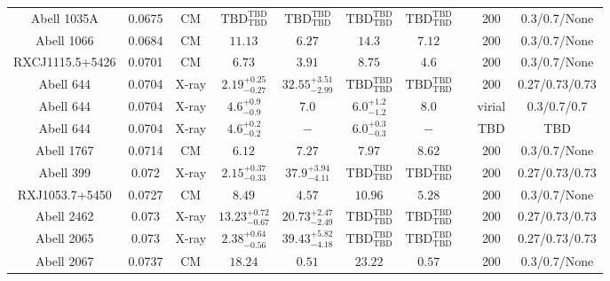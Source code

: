 \begin{table}
\begin{tabular}{cccccccccc}
Abell 1035A & 0.0675 & CM & ${\mathrm{TBD}}^{\mathrm{TBD}}_{\mathrm{TBD}}$ & ${\mathrm{TBD}}^{\mathrm{TBD}}_{\mathrm{TBD}}$ & ${\mathrm{TBD}}^{\mathrm{TBD}}_{\mathrm{TBD}}$ & ${\mathrm{TBD}}^{\mathrm{TBD}}_{\mathrm{TBD}}$ & \citet{RI06.1} & 200 & 0.3/0.7/None \\
Abell 1066 & 0.0684 & CM & ${11.13}^{}_{}$ & ${6.27}^{}_{}$ & ${14.3}^{}_{}$ & ${7.12}^{}_{}$ & \citet{RI06.1} & 200 & 0.3/0.7/None \\
RXCJ1115.5+5426 & 0.0701 & CM & ${6.73}^{}_{}$ & ${3.91}^{}_{}$ & ${8.75}^{}_{}$ & ${4.6}^{}_{}$ & \citet{RI06.1} & 200 & 0.3/0.7/None \\
Abell 644 & 0.0704 & X-ray & ${2.19}^{+0.25}_{-0.27}$ & ${32.55}^{+3.51}_{-2.99}$ & ${\mathrm{TBD}}^{\mathrm{TBD}}_{\mathrm{TBD}}$ & ${\mathrm{TBD}}^{\mathrm{TBD}}_{\mathrm{TBD}}$ & \citet{BA14.1} & 200 & 0.27/0.73/0.73 \\
Abell 644 & 0.0704 & X-ray & ${4.6}^{+0.9}_{-0.9}$ & ${7.0}^{}_{}$ & ${6.0}^{+1.2}_{-1.2}$ & ${8.0}^{}_{}$ & \citet{BU05.1} & virial & 0.3/0.7/0.7 \\
Abell 644 & 0.0704 & X-ray & ${4.6}^{+0.2}_{-0.2}$ & ${-}^{}_{}$ & ${6.0}^{+0.3}_{-0.3}$ & ${-}^{}_{}$ & \citet{XU01.1} & TBD & TBD \\
Abell 1767 & 0.0714 & CM & ${6.12}^{}_{}$ & ${7.27}^{}_{}$ & ${7.97}^{}_{}$ & ${8.62}^{}_{}$ & \citet{RI06.1} & 200 & 0.3/0.7/None \\
Abell 399 & 0.072 & X-ray & ${2.15}^{+0.37}_{-0.33}$ & ${37.9}^{+3.94}_{-4.11}$ & ${\mathrm{TBD}}^{\mathrm{TBD}}_{\mathrm{TBD}}$ & ${\mathrm{TBD}}^{\mathrm{TBD}}_{\mathrm{TBD}}$ & \citet{BA14.1} & 200 & 0.27/0.73/0.73 \\
RXJ1053.7+5450 & 0.0727 & CM & ${8.49}^{}_{}$ & ${4.57}^{}_{}$ & ${10.96}^{}_{}$ & ${5.28}^{}_{}$ & \citet{RI06.1} & 200 & 0.3/0.7/None \\
Abell 2462 & 0.073 & X-ray & ${13.23}^{+0.72}_{-0.67}$ & ${20.73}^{+2.47}_{-2.49}$ & ${\mathrm{TBD}}^{\mathrm{TBD}}_{\mathrm{TBD}}$ & ${\mathrm{TBD}}^{\mathrm{TBD}}_{\mathrm{TBD}}$ & \citet{BA14.1} & 200 & 0.27/0.73/0.73 \\
Abell 2065 & 0.073 & X-ray & ${2.38}^{+0.64}_{-0.56}$ & ${39.43}^{+5.82}_{-4.18}$ & ${\mathrm{TBD}}^{\mathrm{TBD}}_{\mathrm{TBD}}$ & ${\mathrm{TBD}}^{\mathrm{TBD}}_{\mathrm{TBD}}$ & \citet{BA14.1} & 200 & 0.27/0.73/0.73 \\
Abell 2067 & 0.0737 & CM & ${18.24}^{}_{}$ & ${0.51}^{}_{}$ & ${23.22}^{}_{}$ & ${0.57}^{}_{}$ & \citet{RI06.1} & 200 & 0.3/0.7/None \\

\end{tabular}
\end{table}
